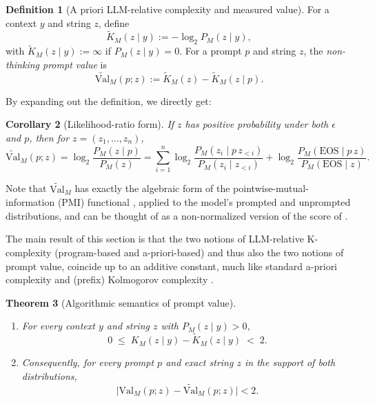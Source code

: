 \documentclass[letterpaper]{article} %
\newtheorem{theorem}{Theorem}[section]
\newtheorem{corollary}[theorem]{Corollary}
\theoremstyle{definition}
\newtheorem{definition}[theorem]{Definition}
\theoremstyle{remark}
\newcommand{\Val}{\mathrm{Val}}
\newcommand{\EOS}{\mathrm{EOS}}
\begin{document}
\begin{definition}[A priori LLM-relative complexity and measured value]\label{def:measured}
For a context $y$ and string $z$, define
\begin{equation}
\widetilde{K}_M(z \mid y) := -\log_2 P_M(z \mid y),
\end{equation}
with $\widetilde{K}_M(z \mid y) := \infty$ if $P_M(z \mid y) = 0$. For a prompt
$p$ and string $z$, the \emph{non-thinking prompt value} is
\begin{equation}
\widetilde{\Val}_M(p;z) := \widetilde{K}_M(z) - \widetilde{K}_M(z \mid p).
\end{equation}
\end{definition}

By expanding out the definition, we directly get:
\begin{corollary}[Likelihood-ratio form]\label{cor:ratio}
If $z$ has positive probability under both $\epsilon$ and $p$, then for
$z = (z_1,\dots,z_n)$,
\begin{equation}\label{eq:tokenwise}
\widetilde{\Val}_M(p;z) = \log_2 \frac{P_M(z \mid p)}{P_M(z)}
= \sum_{i=1}^n
\log_2 \frac{P_M(z_i \mid p\, z_{<i})}{P_M(z_i \mid z_{<i})}
+ \log_2 \frac{P_M(\EOS \mid p\, z)}{P_M(\EOS \mid z)}.
\end{equation}
\end{corollary}

Note that $\widetilde{\Val}_M$ has exactly the algebraic form of the
pointwise-mutual-information (PMI) functional \cite{Fano61,CH90}, applied to
the model's prompted and unprompted distributions, and can be thought of as a
non-normalized version of the score of \cite{Xie26}.

The main result of this section is that the two notions of LLM-relative K-complexity (program-based and a-priori-based) and thus also the two notions of prompt value, coincide up to an additive
constant, much like standard a-priori complexity and (prefix) Kolmogorov
complexity \cite{ZL70}.

\begin{theorem}[Algorithmic semantics of prompt value]\label{thm:semantics}
\leavevmode
\begin{enumerate}
\item[(i)] For every context $y$ and string $z$ with $P_M(z \mid y) > 0$,
\begin{equation}\label{eq:codinggap}
0 \;\le\; K_M(z \mid y) - \widetilde{K}_M(z \mid y) \;<\; 2.
\end{equation}
\item[(ii)] Consequently, for every prompt $p$ and exact string $z$ in the
support of both distributions,
\begin{equation}\label{eq:threebits}
\bigl| \Val_M(p;z) - \widetilde{\Val}_M(p;z) \bigr| < 2.
\end{equation}
\end{enumerate}
\end{theorem}
\end{document}
